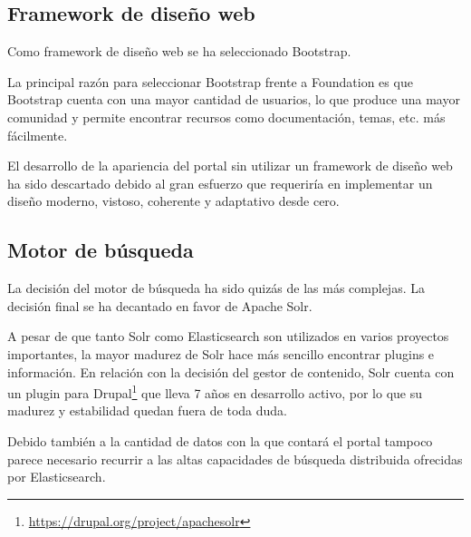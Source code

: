 \subsection{Framework de diseño web}
Como framework de diseño web se ha seleccionado Bootstrap.

La principal razón para seleccionar Bootstrap frente a Foundation es que Bootstrap cuenta con una mayor cantidad de usuarios, lo que produce una mayor comunidad y permite encontrar recursos como documentación, temas, etc. más fácilmente.

El desarrollo de la apariencia del portal sin utilizar un framework de diseño web ha sido descartado debido al gran esfuerzo que requeriría en implementar un diseño moderno, vistoso, coherente y adaptativo desde cero.


\subsection{Motor de búsqueda}
La decisión del motor de búsqueda ha sido quizás de las más complejas. La decisión final se ha decantado en favor de Apache Solr.

A pesar de que tanto Solr como Elasticsearch son utilizados en varios proyectos importantes, la mayor madurez de Solr hace más sencillo encontrar plugins e información.  En relación con la decisión del gestor de contenido, Solr cuenta con un plugin para Drupal\footnote{\url{https://drupal.org/project/apachesolr}} que lleva 7 años en desarrollo activo, por lo que su madurez y estabilidad quedan fuera de toda duda.

Debido también a la cantidad de datos con la que contará el portal tampoco parece necesario recurrir a las altas capacidades de búsqueda distribuida ofrecidas por Elasticsearch.

